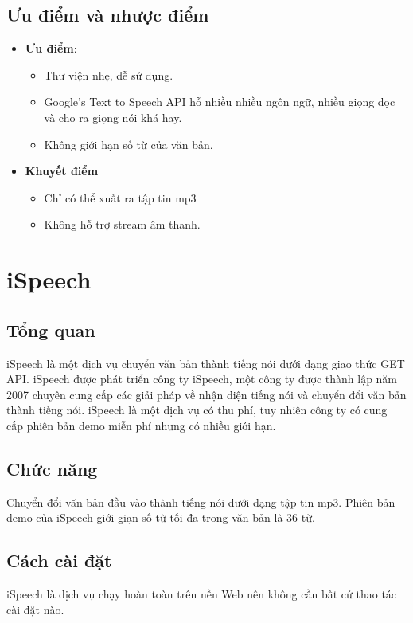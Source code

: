 \subsection{Ưu điểm và nhược điểm}
\begin{itemize}
\item \textbf{Ưu điểm}: 
	\begin{itemize}
	\item Thư viện nhẹ, dễ sử dụng.
	\item Google's Text to Speech API hỗ nhiều nhiều ngôn ngữ, nhiều giọng đọc và cho ra giọng nói khá hay.
	\item Không giới hạn số từ của văn bản.
	\end{itemize}  
\item \textbf{Khuyết điểm}
	\begin{itemize}
	\item Chỉ có thể xuất ra tập tin mp3
	\item Không hỗ trợ stream âm thanh.
	\end{itemize}  
\end{itemize}

\section{iSpeech}
\subsection{Tổng quan}
iSpeech là một dịch vụ chuyển văn bản thành tiếng nói dưới dạng giao thức GET API. iSpeech được phát triển công ty iSpeech, một công ty được thành lập năm 2007 chuyên cung cấp các giải pháp về nhận diện tiếng nói và chuyển đổi văn bản thành tiếng nói.
iSpeech là một dịch vụ có thu phí, tuy nhiên công ty có cung cấp phiên bản demo miễn phí nhưng có nhiều giới hạn.

\subsection{Chức năng}
Chuyển đổi văn bản đầu vào thành tiếng nói dưới dạng tập tin mp3. Phiên bản demo của iSpeech giới giạn số từ tối đa trong văn bản là 36 từ.

\subsection{Cách cài đặt}
iSpeech là dịch vụ chạy hoàn toàn trên nền Web nên không cần bất cứ thao tác cài đặt nào.

